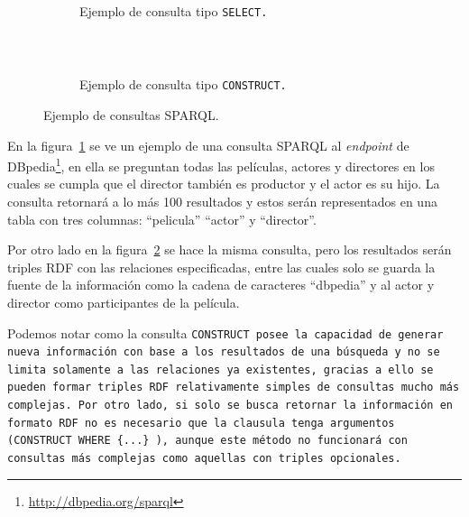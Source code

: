 \begin{figure}[htpb]
  \centering
  \begin{subfigure}[b]{\textwidth}
    \centering
    \begin{tabular}{c}
      
    \end{tabular}
    \caption{Ejemplo de consulta tipo \tt{SELECT}.}
    \label{fig:sparql:select}
  \end{subfigure}
  \\[0.5cm]
  \begin{subfigure}[b]{\textwidth}
    \centering
    \begin{tabular}{c}
      
    \end{tabular}
    \caption{Ejemplo de consulta tipo \tt{CONSTRUCT}.}
    \label{fig:sparql:construct}
  \end{subfigure}
  \caption{Ejemplo de consultas SPARQL.}\label{fig:sparql}
\end{figure}

En la figura~\ref{fig:sparql:select} se ve un ejemplo de una consulta SPARQL al
\emph{endpoint} de DBpedia\footnote{\url{http://dbpedia.org/sparql}}, en ella se
preguntan todas las películas, actores y directores en los cuales se cumpla que
el director también es productor y el actor es su hijo. La consulta retornará a
lo más 100 resultados y estos serán representados en una tabla con tres
columnas: ``pelicula'' ``actor'' y ``director''.

Por otro lado en la figura~\ref{fig:sparql:construct} se hace la misma consulta,
pero los resultados serán triples RDF con las relaciones especificadas, entre
las cuales solo se guarda la fuente de la información como la cadena de
caracteres ``dbpedia'' y al actor y director como participantes de la película.

Podemos notar como la consulta \tt{CONSTRUCT} posee la capacidad de generar
nueva información con base a los resultados de una búsqueda y no se limita
solamente a las relaciones ya existentes, gracias a ello se pueden formar
triples RDF relativamente simples de consultas mucho más complejas. Por otro
lado, si solo se busca retornar la información en formato RDF no es necesario
que la clausula tenga argumentos (\tt{CONSTRUCT WHERE \{...\}} ), aunque este
método no funcionará con consultas más complejas como aquellas con triples
opcionales.

\newpage %
